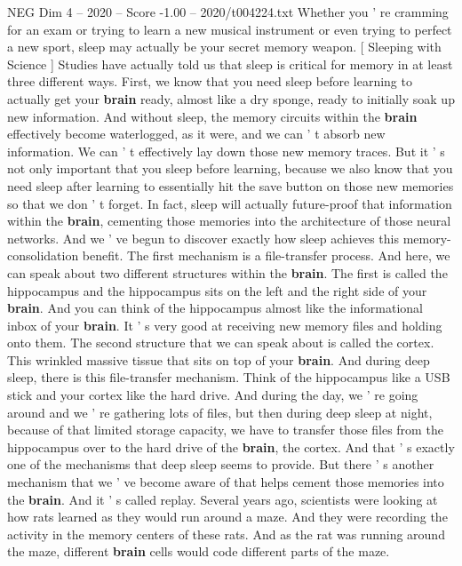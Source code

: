 \begin{textsample}{NEG Dim 4 – 2020 – Score -1.00 – 2020/t004224.txt}  \label{ex:f4_neg_062}
Whether you ' re cramming for an exam or trying to learn a new musical instrument or even trying to perfect a new sport, sleep may actually be your secret memory weapon. [ Sleeping with Science ] Studies have actually told us that sleep is critical for memory in at least three different ways.
First, we know that you need sleep before learning to actually get your \textbf{brain} ready, almost like a dry sponge, ready to initially soak up new information.
And without sleep, the memory circuits within the \textbf{brain} effectively become waterlogged, as it were, and we can ' t absorb new information.
We can ' t effectively lay down those new memory traces.
But it ' s not only important that you sleep before learning, because we also know that you need sleep after learning to essentially hit the save button on those new memories so that we don ' t forget.
In fact, sleep will actually future-proof that information within the \textbf{brain}, cementing those memories into the architecture of those neural networks.
And we ' ve begun to discover exactly how sleep achieves this memory-consolidation benefit.
The first mechanism is a file-transfer process.
And here, we can speak about two different structures within the \textbf{brain}.
The first is called the hippocampus and the hippocampus sits on the left and the right side of your \textbf{brain}.
And you can think of the hippocampus almost like the informational inbox of your \textbf{brain}.
It ' s very good at receiving new memory files and holding onto them.
The second structure that we can speak about is called the cortex.
This wrinkled massive tissue that sits on top of your \textbf{brain}.
And during deep sleep, there is this file-transfer mechanism.
Think of the hippocampus like a USB stick and your cortex like the hard drive.
And during the day, we ' re going around and we ' re gathering lots of files, but then during deep sleep at night, because of that limited storage capacity, we have to transfer those files from the hippocampus over to the hard drive of the \textbf{brain}, the cortex.
And that ' s exactly one of the mechanisms that deep sleep seems to provide.
But there ' s another mechanism that we ' ve become aware of that helps cement those memories into the \textbf{brain}.
And it ' s called replay.
Several years ago, scientists were looking at how rats learned as they would run around a maze.
And they were recording the activity in the memory centers of these rats.
And as the rat was running around the maze, different \textbf{brain} cells would code different parts of the maze.

\end{textsample}
